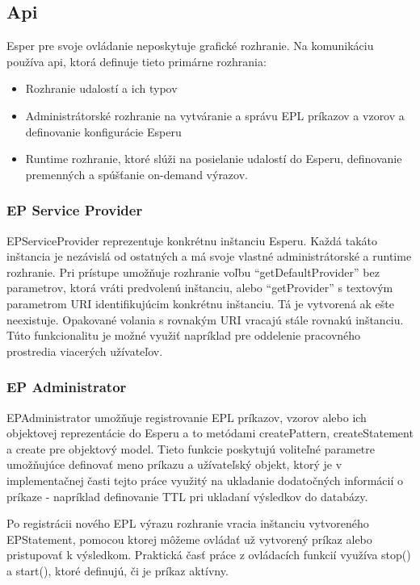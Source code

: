 	\subsection{Api}
		Esper pre svoje ovládanie neposkytuje grafické rozhranie. Na komunikáciu používa api, ktorá definuje tieto primárne rozhrania:
		\begin{itemize}
			\item Rozhranie udalostí a ich typov
			\item Administrátorské rozhranie na vytváranie a správu EPL príkazov a vzorov a definovanie konfigurácie Esperu
			\item Runtime rozhranie, ktoré slúži na posielanie udalostí do Esperu, definovanie premenných a spúšťanie on-demand výrazov.
		\end{itemize}
		
		\subsubsection{EP Service Provider}
		EPServiceProvider reprezentuje konkrétnu inštanciu Esperu. Každá takáto inštancia je nezávislá od ostatných a má svoje vlastné administrátorské a runtime rozhranie. Pri prístupe umožňuje rozhranie voľbu ``getDefaultProvider'' bez parametrov, ktorá vráti predvolenú inštanciu, alebo ``getProvider'' s textovým parametrom URI identifikujúcim konkrétnu inštanciu. Tá je vytvorená ak ešte neexistuje. Opakované volania s rovnakým URI vracajú stále rovnakú inštanciu. Túto funkcionalitu je možné využiť napríklad pre oddelenie pracovného prostredia viacerých užívateľov.
		
		\subsubsection{EP Administrator}
		EPAdministrator umožňuje registrovanie EPL príkazov, vzorov alebo ich objektovej reprezentácie do Esperu a to metódami createPattern, createStatement a create pre objektový model. Tieto funkcie poskytujú voliteľné parametre umožňujúce definovať meno príkazu a užívateľský objekt, ktorý je v implementačnej časti tejto práce využitý na ukladanie dodatočných informácií o príkaze - napríklad definovanie TTL pri ukladaní výsledkov do databázy.
		
		Po registrácii nového EPL výrazu rozhranie vracia inštanciu vytvoreného EPStatement, pomocou ktorej môžeme ovládať už vytvorený príkaz alebo pristupovať k výsledkom. Praktická časť práce z ovládacích funkcií využíva stop() a start(), ktoré definujú, či je príkaz aktívny.
		
